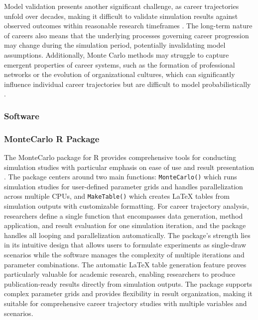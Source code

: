 \documentclass[main.tex]{subfiles}
\begin{document}
Model validation presents another significant challenge, as career trajectories unfold over decades, making it difficult to validate simulation results against observed outcomes within reasonable research timeframes \parencite{petersen2012}. The long-term nature of careers also means that the underlying processes governing career progression may change during the simulation period, potentially invalidating model assumptions. Additionally, Monte Carlo methods may struggle to capture emergent properties of career systems, such as the formation of professional networks or the evolution of organizational cultures, which can significantly influence individual career trajectories but are difficult to model probabilistically \parencite{guo2022nature}.

\subsubsection{Software}

\subsubsection{MonteCarlo R Package}

The MonteCarlo package for R provides comprehensive tools for conducting simulation studies with particular emphasis on ease of use and result presentation \parencite{montecarlo2019}. The package centers around two main functions: \texttt{MonteCarlo()} which runs simulation studies for user-defined parameter grids and handles parallelization across multiple CPUs, and \texttt{MakeTable()} which creates LaTeX tables from simulation outputs with customizable formatting. For career trajectory analysis, researchers define a single function that encompasses data generation, method application, and result evaluation for one simulation iteration, and the package handles all looping and parallelization automatically. The package's strength lies in its intuitive design that allows users to formulate experiments as single-draw scenarios while the software manages the complexity of multiple iterations and parameter combinations. The automatic LaTeX table generation feature proves particularly valuable for academic research, enabling researchers to produce publication-ready results directly from simulation outputs. The package supports complex parameter grids and provides flexibility in result organization, making it suitable for comprehensive career trajectory studies with multiple variables and scenarios.
\end{document}
